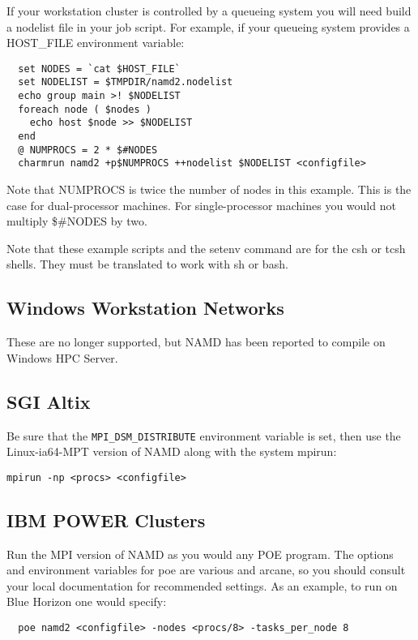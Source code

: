 If your workstation cluster is controlled by a queueing system you
will need build a nodelist file in your job script.  For example, if
your queueing system provides a HOST\_FILE environment variable:

\begin{verbatim}
  set NODES = `cat $HOST_FILE`
  set NODELIST = $TMPDIR/namd2.nodelist
  echo group main >! $NODELIST
  foreach node ( $nodes )
    echo host $node >> $NODELIST
  end
  @ NUMPROCS = 2 * $#NODES
  charmrun namd2 +p$NUMPROCS ++nodelist $NODELIST <configfile>
\end{verbatim}

Note that NUMPROCS is twice the number of nodes in this example.
This is the case for dual-processor machines.  For single-processor
machines you would not multiply \$\#NODES by two.

Note that these example scripts and the setenv command are for the csh
or tcsh shells.  They must be translated to work with sh or bash.

\subsection{Windows Workstation Networks}

These are no longer supported, but NAMD has been reported to compile
on Windows HPC Server.

\subsection{SGI Altix}

Be sure that the {\tt MPI\_DSM\_DISTRIBUTE} environment variable is set, then
use the Linux-ia64-MPT version of NAMD along with the system mpirun:

\begin{verbatim}
mpirun -np <procs> <configfile>
\end{verbatim}

\subsection{IBM POWER Clusters}

Run the MPI version of NAMD as you would any POE program.  The options
and environment variables for poe are various and arcane, so you should
consult your local documentation for recommended settings.  As an
example, to run on Blue Horizon one would specify:

\begin{verbatim}
  poe namd2 <configfile> -nodes <procs/8> -tasks_per_node 8
\end{verbatim}

